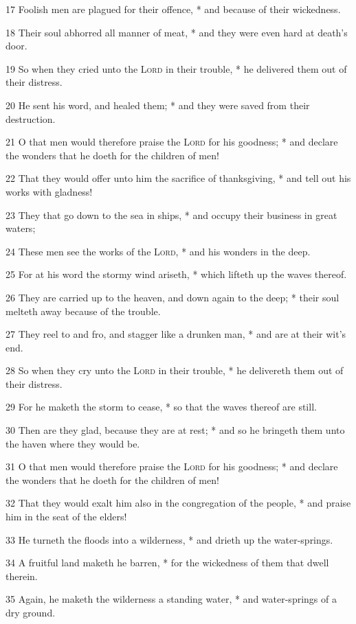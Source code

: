 17 Foolish men are plagued for their offence, * and because of their wickedness.\par
18 Their soul abhorred all manner of meat, * and they were even hard at death's door.\par
19 So when they cried unto the {\textsc{Lord}} in their trouble, * he delivered them out of their distress.\par
20 He sent his word, and healed them; * and they were saved from their destruction.\par
21 O that men would therefore praise the {\textsc{Lord}} for his goodness; * and declare the wonders that he doeth for the children of men!\par
22 That they would offer unto him the sacrifice of thanksgiving, * and tell out his works with gladness!\par
23 They that go down to the sea in ships, * and occupy their business in great waters;\par
24 These men see the works of the {\textsc{Lord}}, * and his wonders in the deep.\par
25 For at his word the stormy wind ariseth, * which lifteth up the waves thereof.\par
26 They are carried up to the heaven, and down again to the deep; * their soul melteth away because of the trouble.\par
27 They reel to and fro, and stagger like a drunken man, * and are at their wit's end.\par
28 So when they cry unto the {\textsc{Lord}} in their trouble, * he delivereth them out of their distress.\par
29 For he maketh the storm to cease, * so that the waves thereof are still.\par
30 Then are they glad, because they are at rest; * and so he bringeth them unto the haven where they would be.\par
31 O that men would therefore praise the {\textsc{Lord}} for his goodness; * and declare the wonders that he doeth for the children of men!\par
32 That they would exalt him also in the congregation of the people, * and praise him in the seat of the elders!\par
33 He turneth the floods into a wilderness, * and drieth up the water-springs.\par
34 A fruitful land maketh he barren, * for the wickedness of them that dwell therein.\par
35 Again, he maketh the wilderness a standing water, * and water-springs of a dry ground.\par
